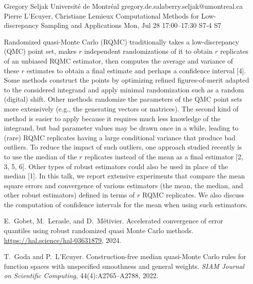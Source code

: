 \begin{talk}
  {Gregory Seljak}%
  {Universit\'e de Montr\'eal}%
  {gregory.de.salaberry.seljak@umontreal.ca}%
  {Pierre L'Ecuyer, Christiane Lemieux}%
  {Computational Methods for Low-discrepancy Sampling and Applications}%
  {}%
  {Mon, Jul 28 17:00--17:30}%
  {S7-4}%
  {S7}%

\medskip

Randomized quasi-Monte Carlo (RQMC) traditionally takes a low-discrepancy (QMC) point set,
makes $r$ independent randomizations of it to obtain $r$ replicates of an unbiased RQMC estimator, 
then computes the average and variance of these $r$ estimates to obtain a final estimate 
and perhaps a confidence interval [4]. 
Some methods construct the points by optimizing refined figures-of-merit adapted to the considered integrand
and apply minimal randomization such as a random (digital) shift.  Other methods randomize
the parameters of the QMC point sets more extensively (e.g., the generating vectors or matrices).
The second kind of method is easier to apply because it requires much less knowledge of the integrand,
but bad parameter values may be drawn once in a while, leading to (rare) RQMC replicates having 
a large conditional variance that produce bad outliers.
To reduce the impact of such outliers, one approach studied recently is to use the median 
of the $r$ replicates instead of the mean as a final estimator [2, 3, 5, 6].
Other types of robust estimators could also be used in place of the median [1].
In this talk, we report extensive experiments that compare the mean square errors 
and convergence of various estimators (the mean, the median, and other robust estimators) 
defined in terms of $r$ RQMC replicates.
We also discuss the computation of confidence intervals for the mean when using such estimators.

{
%
\item
E.~Gobet, M.~Lerasle, and D.~M{\'e}tivier.
Accelerated convergence of error quantiles using robust randomized
  quasi {Monte Carlo} methods.
\url{https://hal.science/hal-03631879}, 2024.

\item
T.~Goda and P.~L'Ecuyer.
Construction-free median quasi-{Monte Carlo} rules for function
  spaces with unspecified smoothness and general weights.
{\em {SIAM} Journal on Scientific Computing}, 44(4):A2765--A2788, 2022.

}
\end{talk}

